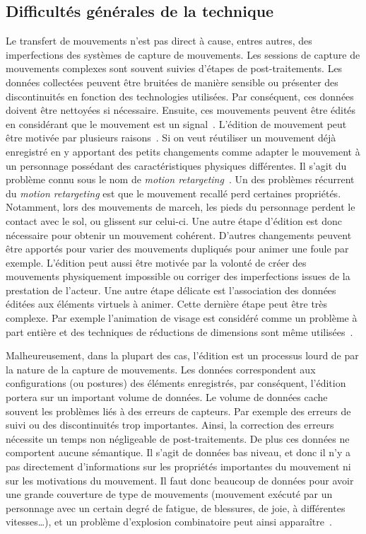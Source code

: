 \subsection{Difficultés générales de la technique}
Le transfert de mouvements n'est pas direct à cause, entres autres, des imperfections
des systèmes de capture de mouvements. Les sessions 
de capture de mouvements complexes sont souvent suivies d'étapes de 
post-traitements. Les données collectées peuvent
être bruitées de manière sensible ou présenter des discontinuités en
fonction des technologies utilisées. Par conséquent, ces données 
doivent être nettoyées si nécessaire. Ensuite, ces mouvements peuvent être
édités en considérant que le mouvement
est un signal~\cite{bruderlin95}. L'édition de mouvement peut être motivée par plusieurs raisons~\cite{gleicher00}.
Si on veut réutiliser un mouvement déjà enregistré
en y apportant des petits changements comme adapter le mouvement
à un personnage possédant des caractéristiques physiques différentes. Il s'agit du problème 
connu sous le nom de \emph{motion retargeting}~\cite{gleicher98}. 
Un des problèmes récurrent du \emph{motion retargeting} est que le mouvement
recallé perd certaines propriétés. Notamment, lors des mouvements de marceh, les pieds du personnage
perdent le contact avec le sol, ou glissent sur celui-ci. Une autre étape 
d'édition est donc nécessaire pour obtenir un mouvement cohérent.
D'autres changements peuvent être apportés pour varier 
des mouvements dupliqués pour animer une foule par exemple. 
L'édition peut aussi être motivée par la volonté 
de créer des mouvements physiquement impossible ou corriger des imperfections
issues de la prestation de l'acteur. Une autre étape délicate est l'association
des données éditées aux éléments virtuels à animer. Cette dernière étape
peut être très complexe. 
Par exemple l'animation de visage est considéré comme un problème à part entière et des
techniques de réductions de dimensions sont même utilisées~\cite{deng06}.

Malheureusement, dans la plupart des cas, l'édition est
un processus lourd de par la nature de la capture de mouvements.
Les données correspondent aux configurations (ou postures) des éléments
enregistrés, par conséquent, l'édition portera sur un important volume de données.
Le volume de données cache souvent les problèmes liés à des erreurs de capteurs.
Par exemple des erreurs de suivi ou des discontinuités trop importantes.
Ainsi, la correction des erreurs nécessite un temps non négligeable de 
post-traitements.
De plus ces données ne comportent aucune sémantique. Il s'agit de données
bas niveau, et donc il n'y a pas directement d'informations sur les propriétés importantes
du mouvement ni sur les motivations du mouvement. Il faut donc beaucoup de données
pour avoir une grande couverture de type de mouvements (mouvement exécuté par un personnage avec
un certain degré de fatigue, de blessures, de joie, à différentes vitesses\ldots), 
et un problème d'explosion combinatoire
peut ainsi apparaître~\cite{gleicher08}.

